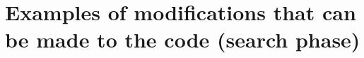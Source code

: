 \documentclass[UKenglish]{latex/atlasdoc}
\begin{document}




\section{Examples of modifications that can be made to the code (search phase)}
\label{sec:examplessearch}
\end{document}
